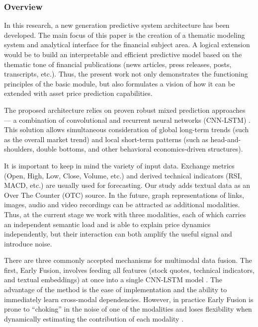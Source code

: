 \subsubsection{Overview}

In this research, a new generation predictive system architecture has been developed. The main focus
of this paper is the creation of a thematic modeling system and analytical interface for the financial
subject area. A logical extension would be to build an interpretable and efficient predictive model based
on the thematic tone of financial publications (news articles, press releases, posts, transcripts, etc.).
Thus, the present work not only demonstrates the functioning principles of the basic module, but also
formulates a vision of how it can be extended with asset price prediction capabilities.

The proposed architecture relies on proven robust mixed prediction approaches --- a combination of convolutional
and recurrent neural networks (CNN-LSTM) \parencite{Hochreiter1997LSTM, CNN1998lecun, CNN_LSTM2020finance}. This solution
allows simultaneous consideration of global long-term trends (such as the overall market trend) and local short-term
patterns (such as head-and-shoulders, double bottoms, and other behavioral economics-driven structures).

It is important to keep in mind the variety of input data. Exchange metrics (Open, High, Low, Close, Volume, etc.)
and derived technical indicators (RSI, MACD, etc.) are usually used for forecasting. Our study adds textual data
as an Over The Counter (OTC) source. In the future, graph representations of links, images, audio and video
recordings can be attracted as additional modalities. Thus, at the current stage we work with three modalities,
each of which carries an independent semantic load and is able to explain price dynamics independently,
but their interaction can both amplify the useful signal and introduce noise.

There are three commonly accepted mechanisms for multimodal data fusion. The first, Early Fusion, involves feeding
all features (stock quotes, technical indicators, and textual embeddings) at once into a single CNN-LSTM model
\parencite{Karpathy_2014_CVPR, dutt2022shared}. The advantage of the method is the ease of implementation and the ability
to immediately learn cross-modal dependencies. However, in practice Early Fusion is prone to “choking” in the noise
of one of the modalities and loses flexibility when dynamically estimating the contribution of each modality
\parencite{dutt2022shared}.

